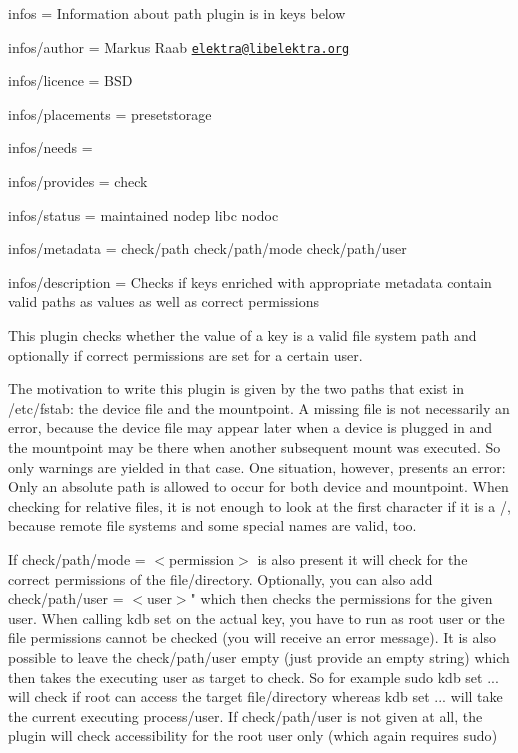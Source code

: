 
\begin{DoxyItemize}
\item infos = Information about path plugin is in keys below
\item infos/author = Markus Raab \href{mailto:elektra@libelektra.org}{\tt elektra@libelektra.\+org}
\item infos/licence = B\+SD
\item infos/placements = presetstorage
\item infos/needs =
\item infos/provides = check
\item infos/status = maintained nodep libc nodoc
\item infos/metadata = check/path check/path/mode check/path/user
\item infos/description = Checks if keys enriched with appropriate metadata contain valid paths as values as well as correct permissions
\end{DoxyItemize}

This plugin checks whether the value of a key is a valid file system path and optionally if correct permissions are set for a certain user.

The motivation to write this plugin is given by the two paths that exist in /etc/fstab\+: the device file and the mountpoint. A missing file is not necessarily an error, because the device file may appear later when a device is plugged in and the mountpoint may be there when another subsequent mount was executed. So only warnings are yielded in that case. One situation, however, presents an error\+: Only an absolute path is allowed to occur for both device and mountpoint. When checking for relative files, it is not enough to look at the first character if it is a {\ttfamily /}, because remote file systems and some special names are valid, too.

If {\ttfamily check/path/mode = $<$permission$>$} is also present it will check for the correct permissions of the file/directory. Optionally, you can also add {\ttfamily check/path/user = $<$user$>$"} which then checks the permissions for the given user. When calling {\ttfamily kdb set} on the actual key, you have to run as {\ttfamily root} user or the file permissions cannot be checked (you will receive an error message). It is also possible to leave the {\ttfamily check/path/user} empty (just provide an empty string) which then takes the executing user as target to check. So for example {\ttfamily sudo kdb set ...} will check if {\ttfamily root} can access the target file/directory whereas {\ttfamily kdb set ...} will take the current executing process/user. If {\ttfamily check/path/user} is not given at all, the plugin will check accessibility for the {\ttfamily root} user only (which again requires {\ttfamily sudo})

